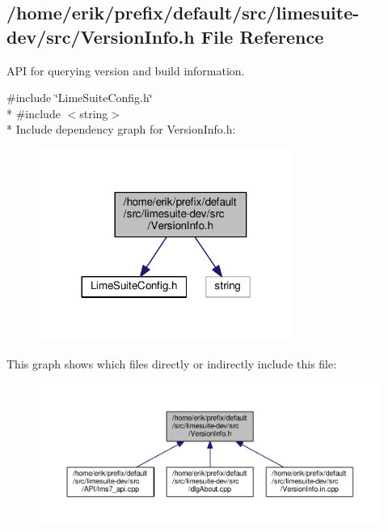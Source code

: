 \subsection{/home/erik/prefix/default/src/limesuite-\/dev/src/\+Version\+Info.h File Reference}
\label{VersionInfo_8h}


A\+PI for querying version and build information.  


{\ttfamily \#include \char`\"{}Lime\+Suite\+Config.\+h\char`\"{}}\\*
{\ttfamily \#include $<$string$>$}\\*
Include dependency graph for Version\+Info.\+h\+:
\nopagebreak
\begin{figure}[H]
\begin{center}
\leavevmode
\includegraphics[width=236pt]{dc/dee/VersionInfo_8h__incl}
\end{center}
\end{figure}
This graph shows which files directly or indirectly include this file\+:
\nopagebreak
\begin{figure}[H]
\begin{center}
\leavevmode
\includegraphics[width=350pt]{d1/deb/VersionInfo_8h__dep__incl}
\end{center}
\end{figure}
